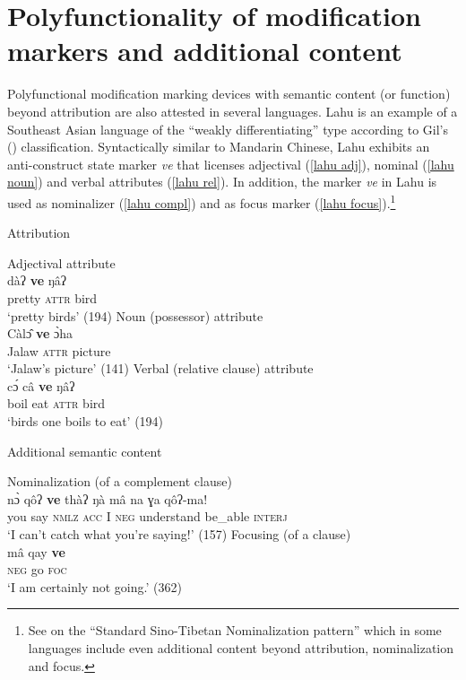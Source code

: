 \section[Polyfunctionality and additional content]{Polyfunctionality of modification markers and additional content}
Polyfunctional modification marking devices with semantic content (or function) beyond attribution are also attested in several languages. Lahu is an example of a Southeast Asian language of the “weakly differentiating” type according to Gil's (\citeyear{gil2005}) classification. Syntactically similar to Mandarin Chinese, Lahu exhibits an anti-construct state marker \textit{ve} that licenses adjectival (\ref{lahu adj}), nominal (\ref{lahu noun}) and verbal attributes (\ref{lahu rel}). In addition, the marker \textit{ve} in Lahu is used as nominalizer (\ref{lahu compl}) and as focus marker (\ref{lahu focus}).\footnote{See \citealt{bickel1999} on the “Standard Sino-Tibetan Nominalization pattern” which in some languages include even additional content beyond attribution, nominalization and focus.}
\begin{exe}
\ex
{}
\begin{xlist}
\ex	\textrm{Attribution}
\begin{xlist}
\ex	\textrm{Adjectival attribute}\\
\gll	dàʔ	\textbf{ve}	ŋâʔ\\
	pretty	\textsc{attr}	bird\\
\glt	‘pretty birds’ (194)\label{lahu adj}
\ex	\textrm{Noun (possessor) attribute}\\
\gll	Càl\^{ɔ}	\textbf{ve}	\`{ɔ}ha\\
	Jalaw	\textsc{attr}	picture\\
\glt	‘Jalaw's picture’ (141)\label{lahu noun}
\ex	\textrm{Verbal (relative clause) attribute}\\
\gll	c\'{ɔ}	câ	\textbf{ve}	ŋâʔ\\
	boil	eat	\textsc{attr}	bird\\
\glt	‘birds one boils to eat’ (194)\label{lahu rel}
\end{xlist}
\ex	\textrm{Additional semantic content}
\begin{xlist}
\ex \textrm{Nominalization (of a complement clause)}\\
\gll	n\`{ɔ}	qôʔ \textbf{ve}	thàʔ	ŋà mâ	na ɣa	qôʔ-ma!\\
	you	say \textsc{nmlz}	\textsc{acc} I	\textsc{neg} understand	be\_able	\textsc{interj}\\
\glt	‘I can't catch what you're saying!’ (157)\label{lahu compl}
\ex	\textrm{Focusing (of a clause)}\\
\gll	mâ		qay	\textbf{ve}\\
	\textsc{neg}	go	\textsc{foc}\\
\glt	‘I am certainly not going.’ (362)\label{lahu focus}
\end{xlist}
\end{xlist}
\end{exe}
